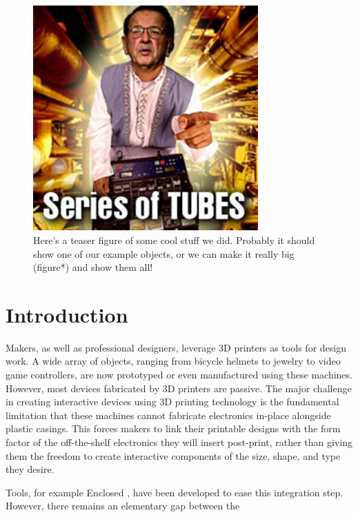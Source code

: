 \begin{figure}[h]
\centering
    \includegraphics[width=3.4in]{figures/series-of-tubes.jpg}
\caption{Here's a teaser figure of some cool stuff we did. Probably it should show one of our example objects, or we can make it really big (figure*) and show them all!}
\label{fig:teaser}
\end{figure}

\section{Introduction}

Makers, as well as professional designers, leverage 3D printers as tools for design work.  A wide array of objects, ranging from bicycle helmets to jewelry to video game controllers, are now prototyped or even manufactured using these machines.  However, most devices fabricated by 3D printers are passive.  The major challenge in creating interactive devices using 3D printing technology is the fundamental limitation that these machines cannot fabricate electronics in-place alongside plastic casings.  This forces makers to link their printable designs with the form factor of the off-the-shelf electronics they will insert post-print, rather than giving them the freedom to create interactive components of the size, shape, and type they desire.

Tools, for example Enclosed \cite{Weichel-enclosed}, have been developed to ease this integration step.  However, there remains an elementary gap between the 

